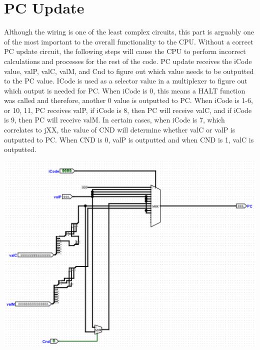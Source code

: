 \documentclass{article}
\begin{document}
\section{PC Update}
Although the wiring is one of the least complex circuits, this part is arguably one of the most important to the overall functionality to the CPU. Without a correct PC update circuit, the following steps will cause the CPU to perform incorrect calculations and processes for the rest of the code. PC update receives the iCode value, valP, valC, valM, and Cnd to figure out which value needs to be outputted to the PC value. ICode is used as a selector value in a multiplexer to figure out which output is needed for PC. When iCode is 0, this means a HALT function was called and therefore, another 0 value is outputted to PC. When iCode is 1-6, or 10, 11, PC receives valP, if iCode is 8, then PC will receive valC, and if iCode is 9, then PC will receive valM. In certain cases, when iCode is 7, which correlates to jXX, the value of CND will determine whether valC or valP is outputted to PC. When CND is 0, valP is outputted and when CND is 1, valC is outputted. 
\begin{center}
    \includegraphics[scale=.6]{pcupdate.png} \\
\end{center}
\end{document}
